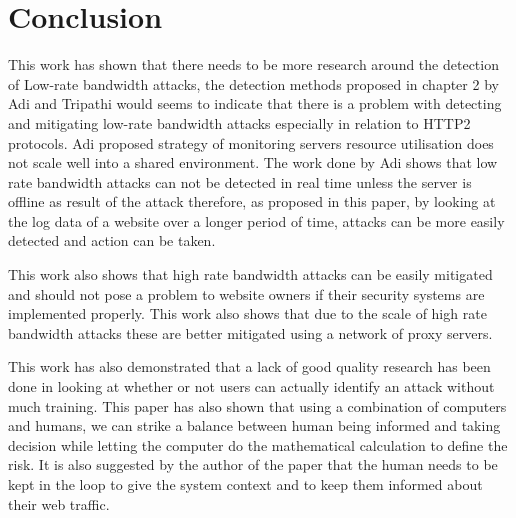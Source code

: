 \section{Conclusion}

This work has shown that there needs to be more research around the detection of Low-rate bandwidth attacks, the detection methods proposed in chapter 2 by Adi and Tripathi would seems to indicate that there is a problem with detecting and mitigating low-rate bandwidth attacks especially in relation to HTTP2 protocols. Adi proposed strategy of monitoring servers resource utilisation does not scale well into a shared environment. The work done by Adi shows that low rate bandwidth attacks can not be detected in real time unless the server is offline as result of the attack therefore, as proposed in this paper, by looking at the log data of a website over a longer period of time, attacks can be more easily detected and action can be taken.

This work also shows that high rate bandwidth attacks can be easily mitigated and should not pose a problem to website owners if their security systems are implemented properly. This work also shows that due to the scale of high rate bandwidth attacks these are better mitigated using a network of proxy servers. 

This work has also demonstrated that a lack of good quality research has been done in looking at whether or not users can actually identify an attack without much training. This paper has also shown that using a combination of computers and humans, we can strike a balance between human being informed and taking decision while letting the computer do the mathematical calculation to define the risk. It is also suggested by the author of the paper that the human needs to be kept in the loop to give the system context and to keep them informed about their web traffic. 



